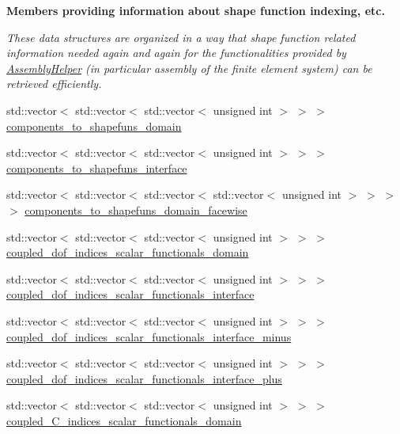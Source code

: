 \begin{Indent}{\bf Members providing information about shape function indexing, etc.}\par
{\em These data structures are organized in a way that shape function related information needed again and again for the functionalities provided by \hyperlink{class_assembly_helper}{Assembly\+Helper} (in particular assembly of the finite element system) can be retrieved efficiently. }\begin{DoxyCompactItemize}
\item 
std\+::vector$<$ std\+::vector$<$ std\+::vector$<$ unsigned int $>$ $>$ $>$ \hyperlink{class_assembly_helper_a0bdb6e2e2f9623f3f10dfa2ebe8e234c}{components\+\_\+to\+\_\+shapefuns\+\_\+domain}
\item 
std\+::vector$<$ std\+::vector$<$ std\+::vector$<$ unsigned int $>$ $>$ $>$ \hyperlink{class_assembly_helper_abcad51e64347fc3141d2840a2835b46c}{components\+\_\+to\+\_\+shapefuns\+\_\+interface}
\item 
std\+::vector$<$ std\+::vector$<$ std\+::vector$<$ std\+::vector$<$ unsigned int $>$ $>$ $>$ $>$ \hyperlink{class_assembly_helper_ae92560183f1d2060265f0744a84f0349}{components\+\_\+to\+\_\+shapefuns\+\_\+domain\+\_\+facewise}
\item 
std\+::vector$<$ std\+::vector$<$ std\+::vector$<$ unsigned int $>$ $>$ $>$ \hyperlink{class_assembly_helper_a1a26b40224e3f04e5168accc91486493}{coupled\+\_\+dof\+\_\+indices\+\_\+scalar\+\_\+functionals\+\_\+domain}
\item 
std\+::vector$<$ std\+::vector$<$ std\+::vector$<$ unsigned int $>$ $>$ $>$ \hyperlink{class_assembly_helper_ab346e146cf91fb7a0688076551b37355}{coupled\+\_\+dof\+\_\+indices\+\_\+scalar\+\_\+functionals\+\_\+interface}
\item 
std\+::vector$<$ std\+::vector$<$ std\+::vector$<$ unsigned int $>$ $>$ $>$ \hyperlink{class_assembly_helper_a12299d82365553a21fef8529c8fe8a17}{coupled\+\_\+dof\+\_\+indices\+\_\+scalar\+\_\+functionals\+\_\+interface\+\_\+minus}
\item 
std\+::vector$<$ std\+::vector$<$ std\+::vector$<$ unsigned int $>$ $>$ $>$ \hyperlink{class_assembly_helper_af07bb528fdd350e9b467b08dc44a03e7}{coupled\+\_\+dof\+\_\+indices\+\_\+scalar\+\_\+functionals\+\_\+interface\+\_\+plus}
\item 
std\+::vector$<$ std\+::vector$<$ std\+::vector$<$ unsigned int $>$ $>$ $>$ \hyperlink{class_assembly_helper_a0edd25820c92a25ae87fc240f4916804}{coupled\+\_\+\+C\+\_\+indices\+\_\+scalar\+\_\+functionals\+\_\+domain}

\end{DoxyCompactItemize}
\end{Indent}
